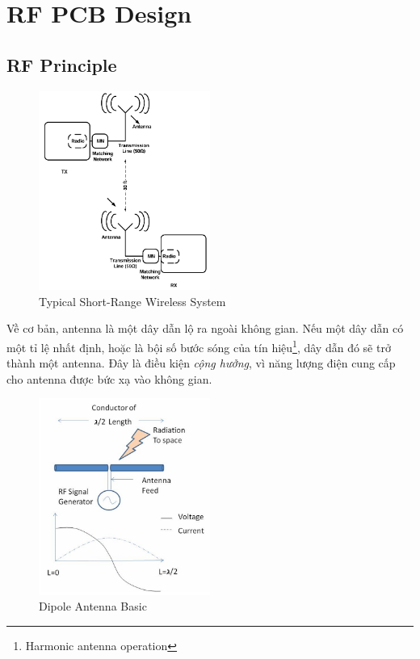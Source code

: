 \chapter{RF PCB Design}
    \section{RF Principle}
        \begin{figure}[h]
            \centering
            \includegraphics[width=0.5\textwidth]{figures/wireless_system.png}
            \caption{Typical Short-Range Wireless System}
            \label{fig:wireless_system}
        \end{figure}
        \newpage

        Về cơ bản, antenna là một dây dẫn lộ ra ngoài không gian. Nếu một dây dẫn có một tỉ lệ nhất định,
        hoặc là bội số bước sóng của tín hiệu\footnote{Harmonic antenna operation}, dây dẫn đó sẽ trở thành một antenna.
        Đây là điều kiện \textit{cộng hưởng}, vì năng lượng điện cung cấp cho antenna được bức xạ vào không gian.\cite{Infineon2023_rflayout}\par
        \begin{figure}[h]
            \centering
            \includegraphics[width=0.5\textwidth]{figures/dipole_antenna_basic.png}
            \caption{Dipole Antenna Basic}
            \label{fig:dipole_antenna_basic}
        \end{figure}

